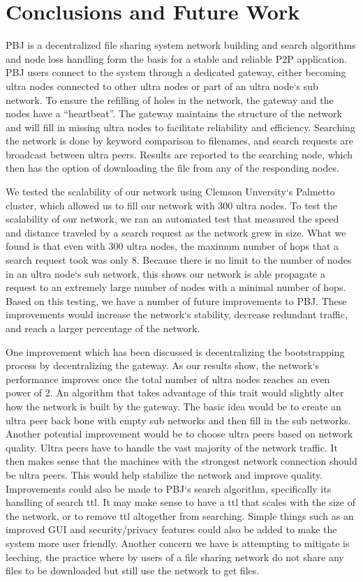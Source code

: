 \documentclass{acm_proc_article-sp}
\begin{document}
\section{Conclusions and Future Work}

PBJ is a decentralized file sharing system network building and search algorithms and node loss handling form the basis for a stable and reliable P2P application. PBJ users connect to the system through a dedicated gateway, either becoming ultra nodes connected to other ultra nodes or part of an ultra node`s sub network. To ensure the refilling of holes in the network, the gateway and the nodes have a ``heartbeat''. The gateway maintains the structure of the network and will fill in missing ultra nodes to facilitate reliability and efficiency. Searching the network is done by keyword comparison to filenames, and search requests are broadcast between ultra peers. Results are reported to the searching node, which then has the option of downloading the file from any of the responding nodes.

We tested the scalability of our network using Clemson Unversity`s Palmetto cluster, which allowed us to fill our network with 300 ultra nodes. To test the scalability of our network, we ran an automated test that measured the speed and distance traveled by a search request as the network grew in size. What we found is that even with 300 ultra nodes, the maximum number of hops that a search request took was only 8. Because there is no limit to the number of nodes in an ultra node`s sub network, this shows our network is able propagate a request to an extremely large number of nodes with a minimal number of hops.  Based on this testing, we have a number of future improvements to PBJ.  These improvements would increase the network`s stability, decrease redundant traffic, and reach a larger percentage of the network.


One improvement which has been discussed is decentralizing the bootstrapping process by decentralizing the gateway. As our results show, the network`s performance improves once the total number of ultra nodes reaches an even power of 2. An algorithm that takes advantage of this trait would slightly alter how the network is built by the gateway. The basic idea would be to create an ultra peer back bone with empty sub networks and then fill in the sub networks. Another potential improvement would be to choose ultra peers based on network quality. Ultra peers have to handle the vast majority of the network traffic. It then makes sense that the machines with the strongest network connection should be ultra peers. This would help stabilize the network and improve quality. Improvements could also be made to PBJ`s search algorithm, specifically its handling of search ttl. It may make sense to have a ttl that scales with the size of the network, or to remove ttl altogether from searching. Simple things such as an improved GUI and security/privacy features could also be added to make the system more user friendly. Another concern we have is attempting to mitigate is leeching, the practice where by users of a file sharing network do not share any files to be downloaded but still use the network to get files.
\end{document}
